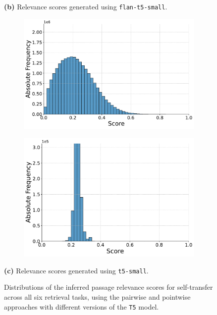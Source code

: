 \begin{figure}[t!]
    \vspace{-0.5cm}
    \textbf{(b)} Relevance scores generated using \texttt{flan-t5-small}.
    \vspace{0.5cm}

    \begin{subfigure}[b]{0.49\textwidth}
        \centering
        \includegraphics[width=\textwidth]{graphics/seaborn/pairwise_self_score_distribution_t5-small.pdf}
        \label{fig:pairwise_t5-small}
    \end{subfigure}
    \hfill
    \begin{subfigure}[b]{0.49\textwidth}
        \centering
        \includegraphics[width=\textwidth]{graphics/seaborn/pointwise_self_score_distribution_t5-small.pdf}
        \label{fig:pointwise_t5-small}
    \end{subfigure}

    \vspace{-0.5cm}
    \textbf{(c)} Relevance scores generated using \texttt{t5-small}.
    \vspace{0.5cm}

    \caption{Distributions of the inferred passage relevance scores for self-transfer across all six retrieval tasks, using the pairwise and pointwise approaches with different versions of the \texttt{T5} model.}
    \label{fig:score-distributions}
\end{figure}
